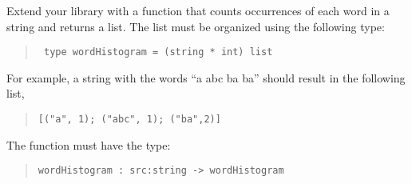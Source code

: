 \label{wordHistogram}
Extend your library with a function that counts occurrences of each
word in a string and returns a list. The list must be organized using
the following type:
\begin{quote}
  \mbox{\lstinline! type wordHistogram = (string * int) list!}
\end{quote}
For example, a string with the words ``a abc ba ba'' should result in the
following list,
\begin{quote}
  \mbox{\lstinline![("a", 1); ("abc", 1); ("ba",2)]!}
\end{quote}
The function must have the type:
\begin{quote}
  \mbox{\lstinline!wordHistogram : src:string -> wordHistogram!}
\end{quote}
